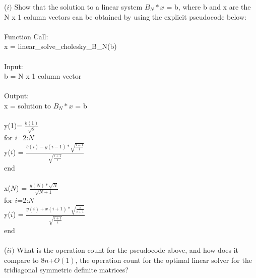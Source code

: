 \documentclass{article}
\DeclareMathOperator{\1}{\mathit{1}}
\numberwithin{figure}{section} %
\numberwithin{table}{section}
\begin{document}
(\(i)\) Show that the solution to a linear system \(B_N*x\) = b, where b and x are the N x 1 column vectors can be obtained by using the explicit pseudocode below:\\\\
	\indent \hspace{5 cm} Function Call:\\
	\indent \hspace{5 cm} x = linear\_solve\_cholesky\_B\_N(b)\\\\
	\indent \hspace{5 cm} Input:\\
	\indent \hspace{5 cm} b = N x 1 column vector \\\\
	\indent \hspace{5 cm} Output:\\
	\indent \hspace{5 cm} x = solution to \(B_N*x\) = b\\\\
	\indent \hspace{5 cm} y(1)= \(\frac{b(1)}{\sqrt{2}}\) \\
	\indent \hspace{5 cm} for \(i\)=2:\(N\) \\
	\indent \hspace{5 cm} \indent y(\(i\)) = \(\frac{b(i)-y(i-1)*\sqrt{\frac{i-1}{i}}}{\sqrt{\frac{i+1}{i}}}\) \\
	\indent \hspace{5 cm} end \\\\
	\indent \hspace{5 cm} x(\(N\)) = \(\frac{y(N) * \sqrt{N}}{\sqrt{N+1}}\)\\
	\indent \hspace{5 cm} for \(i\)=2:\(N\) \\
	\indent \hspace{5 cm} \indent y(\(i\)) = \(\frac{y(i)+x(i+1)*\sqrt{\frac{i}{i+1}}}{\sqrt{\frac{i+1}{i}}}\) \\
	\indent \hspace{5 cm} end \\\\
	
(\(ii)\) What is the operation count for the pseudocode above, and how does it compare to \(8n\)+\(O(1)\), the operation count for the optimal linear solver for the tridiagonal symmetric definite matrices? \\\\
\end{document}
